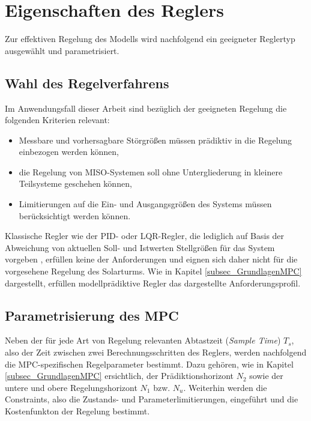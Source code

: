\section{Eigenschaften des Reglers} \label{sec_Reglereigenschaften}
Zur effektiven Regelung des Modells wird nachfolgend ein geeigneter Reglertyp ausgewählt und parametrisiert.

\subsection{Wahl des Regelverfahrens} \label{subsec_ReglerverfahrenWahl}
Im Anwendungsfall dieser Arbeit sind bezüglich der geeigneten Regelung die folgenden Kriterien relevant:
\begin{itemize}
\item Messbare und vorhersagbare Störgrößen müssen prädiktiv in die Regelung einbezogen werden können,
    \item die Regelung von MISO-Systemen soll ohne Untergliederung in kleinere Teilsysteme geschehen können,
\item Limitierungen auf die Ein- und Ausgangsgrößen des Systems müssen berücksichtigt werden können.
\end{itemize}
Klassische Regler wie der PID- oder LQR-Regler, die lediglich auf Basis der Abweichung von aktuellen Soll- und Istwerten Stellgrößen für das System vorgeben \cite[S.408]{Lunze}, erfüllen keine der Anforderungen und eignen sich daher nicht für die vorgesehene Regelung des Solarturms.
Wie in Kapitel \ref{subsec_GrundlagenMPC} dargestellt, erfüllen modellprädiktive Regler das dargestellte Anforderungsprofil.


\subsection{Parametrisierung des MPC} \label{subsec_ParameterMPC}
Neben der für jede Art von Regelung relevanten Abtastzeit (\textit{Sample Time}) $T_s$, also der Zeit zwischen zwei Berechnungsschritten des Reglers, werden nachfolgend die MPC-spezifischen Regelparameter bestimmt.
Dazu gehören, wie in Kapitel \ref{subsec_GrundlagenMPC} ersichtlich, der Prädiktionshorizont $N_2$ sowie der untere und obere Regelungshorizont $N_1$ bzw. $N_u$.
Weiterhin werden die Constraints, also die Zustands- und Parameterlimitierungen, eingeführt und die Kostenfunkton der Regelung bestimmt.

